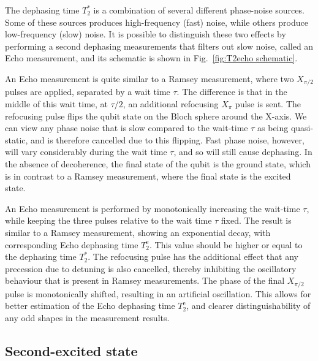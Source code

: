           The dephasing time $T_2^*$ is a combination of several different phase-noise sources. Some of these sources produces high-frequency (fast) noise, while others produce low-frequency (slow) noise. It is possible to distinguish these two effects by performing a second dephasing measurements that filters out slow noise, called an Echo measurement, and its schematic is shown in Fig.~\ref{fig:T2echo schematic}.

          An Echo measurement is quite similar to a Ramsey measurement, where two $X_{\pi/2}$ pulses are applied, separated by a wait time $\tau$. The difference is that in the middle of this wait time, at $\tau/2$, an additional refocusing $X_{\pi}$ pulse is sent. The refocusing pulse flips the qubit state on the Bloch sphere around the X-axis. We can view any phase noise that is slow compared to the wait-time $\tau$ as being quasi-static, and is therefore cancelled due to this flipping. Fast phase noise, however, will vary considerably during the wait time $\tau$, and so will still cause dephasing. In the absence of decoherence, the final state of the qubit is the ground state, which is in contrast to a Ramsey measurement, where the final state is the excited state.

          An Echo measurement is performed by monotonically increasing the wait-time $\tau$, while keeping the three pulses relative to the wait time $\tau$ fixed. The result is similar to a Ramsey measurement, showing an exponential decay, with corresponding Echo dephasing time $T_2^\text{e}$. This value should be higher or equal to the dephasing time $T_2^*$. The refocusing pulse has the additional effect that any precession due to detuning is also cancelled, thereby inhibiting the oscillatory behaviour that is present in Ramsey measurements. The phase of the final $X_{\pi/2}$ pulse is monotonically shifted, resulting in an artificial oscillation. This allows for better estimation of the Echo dephasing time $T_2^\text{e}$, and clearer distinguishability of any odd shapes in the measurement results.
      \newpage
      \subsection{Second-excited state}
        \label{ssec:Second-excited state}

